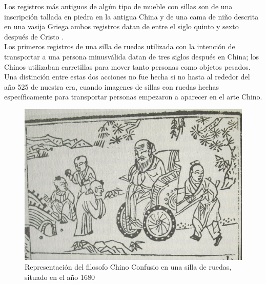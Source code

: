 Los registros m\'as antiguos de alg\'un tipo de mueble con sillas son de una
inscripci\'on tallada en piedra en la antigua China y de una cama de ni\~no
descrita en una vasija Griega ambos registros datan de entre el siglo quinto y
sexto despu\'es de Cristo \parencite{history}.
\\
Los primeros registros de una silla de ruedas utilizada con la intenci\'on de
transportar a una persona minusv\'alida datan de tres siglos despu\'es en China;
los Chinos utilizaban carretillas para mover tanto personas como objetos
pesados. Una distinci\'on entre estas dos acciones no fue hecha si no hasta al
rededor del a\~no 525 de nuestra era, cuando imagenes de sillas con ruedas
hechas espec\'ificamente para transportar personas empezaron a aparecer en el
arte Chino. \parencite{primera}
\begin{figure}[th]
    \centering
    \includegraphics[width=.8\textwidth]{Figures/confusio.jpg}
    \decoRule
    \caption{Representaci\'on del filosofo Chino Confusio en una
    silla de ruedas, situado en el a\~no 1680}
    \label{fig:Electron}
\end{figure}

